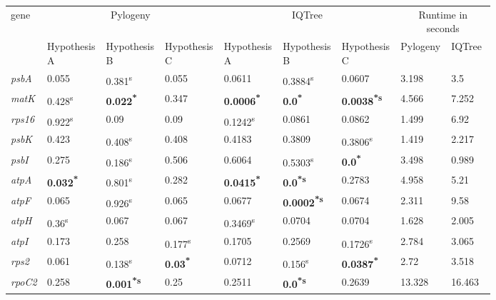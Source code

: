 \documentclass[a4paper]{article}
\begin{document}
\footnotesize
\begin{tabular}{p{0.03\linewidth}|p{0.095\linewidth}p{0.095\linewidth}p{0.095\linewidth}|p{0.095\linewidth}p{0.095\linewidth}p{0.095\linewidth}|p{0.095\linewidth}p{0.095\linewidth}}
gene & \multicolumn{3}{c}{Pylogeny}  & \multicolumn{3}{c}{IQTree} & \multicolumn{2}{c}{Runtime in seconds}\\
 & Hypothesis A & Hypothesis B & Hypothesis C & Hypothesis A & Hypothesis B & Hypothesis C & Pylogeny & IQTree\\
 \rowcolor{black!20} \textit{psbA} & 0.055 & 0.381\textsuperscript{s} & 0.055 & 0.0611 & 0.3884\textsuperscript{s} & 0.0607 & 3.198 & 3.5\\
\textit{matK} & 0.428\textsuperscript{s} & \textbf{0.022\textsuperscript{*}} & 0.347 & \textbf{0.0006\textsuperscript{*}} & \textbf{0.0\textsuperscript{*}} & \textbf{0.0038\textsuperscript{*}\textsuperscript{s}} & 4.566 & 7.252\\
 \rowcolor{black!20} \textit{rps16} & 0.922\textsuperscript{s} & 0.09 & 0.09 & 0.1242\textsuperscript{s} & 0.0861 & 0.0862 & 1.499 & 6.92\\
\textit{psbK} & 0.423 & 0.408\textsuperscript{s} & 0.408 & 0.4183 & 0.3809 & 0.3806\textsuperscript{s} & 1.419 & 2.217\\
 \rowcolor{black!20} \textit{psbI} & 0.275 & 0.186\textsuperscript{s} & 0.506 & 0.6064 & 0.5303\textsuperscript{s} & \textbf{0.0\textsuperscript{*}} & 3.498 & 0.989\\
\textit{atpA} & \textbf{0.032\textsuperscript{*}} & 0.801\textsuperscript{s} & 0.282 & \textbf{0.0415\textsuperscript{*}} & \textbf{0.0\textsuperscript{*}\textsuperscript{s}} & 0.2783 & 4.958 & 5.21\\
 \rowcolor{black!20} \textit{atpF} & 0.065 & 0.926\textsuperscript{s} & 0.065 & 0.0677 & \textbf{0.0002\textsuperscript{*}\textsuperscript{s}} & 0.0674 & 2.311 & 9.58\\
\textit{atpH} & 0.36\textsuperscript{s} & 0.067 & 0.067 & 0.3469\textsuperscript{s} & 0.0704 & 0.0704 & 1.628 & 2.005\\
 \rowcolor{black!20} \textit{atpI} & 0.173 & 0.258 & 0.177\textsuperscript{s} & 0.1705 & 0.2569 & 0.1726\textsuperscript{s} & 2.784 & 3.065\\
\textit{rps2} & 0.061 & 0.138\textsuperscript{s} & \textbf{0.03\textsuperscript{*}} & 0.0712 & 0.156\textsuperscript{s} & \textbf{0.0387\textsuperscript{*}} & 2.72 & 3.518\\
 \rowcolor{black!20} \textit{rpoC2} & 0.258 & \textbf{0.001\textsuperscript{*}\textsuperscript{s}} & 0.25 & 0.2511 & \textbf{0.0\textsuperscript{*}\textsuperscript{s}} & 0.2639 & 13.328 & 16.463\\

\end{tabular}
\end{document}
